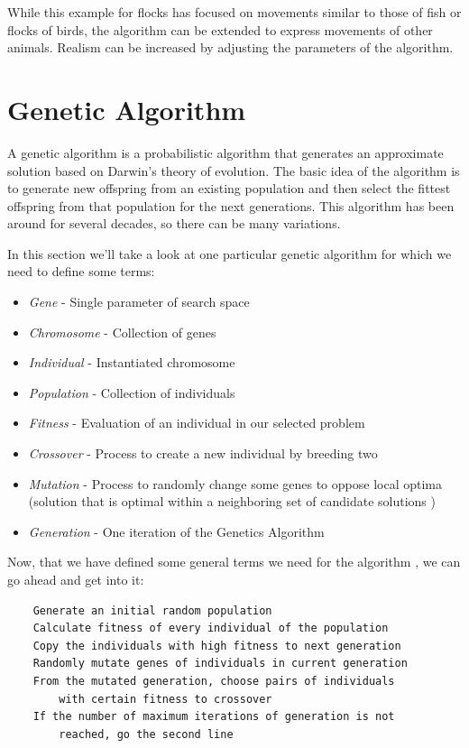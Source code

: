 \documentclass[a4paper,12pt,openright]{book}
\begin{document}
While this example for flocks \cite{FlocksReynolds} has focused on movements similar to those of fish or flocks of birds, the algorithm can be extended to express movements of other animals. Realism can be increased by adjusting the parameters of the algorithm.

\section{Genetic Algorithm}

A genetic algorithm \cite{GameAIGeneticAlg} is a probabilistic algorithm that generates an approximate solution based on Darwin's theory of evolution. The basic idea of the algorithm is to generate new offspring from an existing population and then select the fittest offspring from that population for the next generations. This algorithm has been around for several decades, so there can be many variations.

In this section we'll take a look at one particular genetic algorithm for which we need to define some terms:

\begin{itemize}
    \item \emph{Gene} - Single parameter of search space
    \item \emph{Chromosome} - Collection of genes
    \item \emph{Individual} - Instantiated chromosome
    \item \emph{Population} - Collection of individuals
    \item \emph{Fitness} - Evaluation of an individual in our selected problem
    \item \emph{Crossover} - Process to create a new individual by breeding two
    \item \emph{Mutation} - Process to randomly change some genes to oppose local optima (solution that is optimal within a neighboring set of candidate solutions \cite{LocalOptimum}) 
    \item \emph{Generation} - One iteration of the Genetics Algorithm
\end{itemize}

\clearpage

Now, that we have defined some general terms we need for the algorithm \cite{GameAIGeneticAlg}, we can go ahead and get into it:

\begin{verbatim}
    Generate an initial random population
    Calculate fitness of every individual of the population
    Copy the individuals with high fitness to next generation
    Randomly mutate genes of individuals in current generation
    From the mutated generation, choose pairs of individuals 
        with certain fitness to crossover
    If the number of maximum iterations of generation is not 
        reached, go the second line
\end{verbatim}
\end{document}
